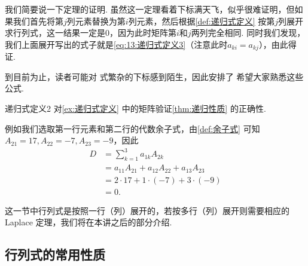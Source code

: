 我们简要说一下定理的证明. 虽然这一定理看着下标满天飞，似乎很难证明，但如果我们首先将第$j$列元素替换为第$i$列元素，然后根据\autoref{def:递归式定义} 按第$j$列展开求行列式，这一结果一定是0，因为此时矩阵第$i$和$j$两列完全相同. 同时我们发现，我们上面展开写出的式子就是\autoref{eq:13:递归式定义3}（注意此时$a_{ki}=a_{kj}$），由此得证.

到目前为止，读者可能对 式繁杂的下标感到陌生，因此安排了 希望大家熟悉这些公式.
\begin{example}{}{递归式定义2}
    对\autoref{ex:递归式定义} 中的矩阵验证\autoref{thm:递归性质} 的正确性.
\end{example}

\begin{solution}
    例如我们选取第一行元素和第二行的代数余子式，由\autoref{def:余子式} 可知$A_{21}=17,A_{22}=-7,A_{23}=-9$，因此
    \begin{align*}
        D & =\sum_{k=1}^{3}a_{1k}A_{2k}             \\
          & =a_{11}A_{21}+a_{12}A_{22}+a_{13}A_{23} \\
          & =2 \cdot 17+1 \cdot (-7)+3 \cdot (-9)   \\
          & =0.
    \end{align*}
\end{solution}

这一节中行列式是按照一行（列）展开的，若按多行（列）展开则需要相应的 Laplace 定理，我们将在本讲之后的部分介绍.

\subsection{行列式的常用性质}

